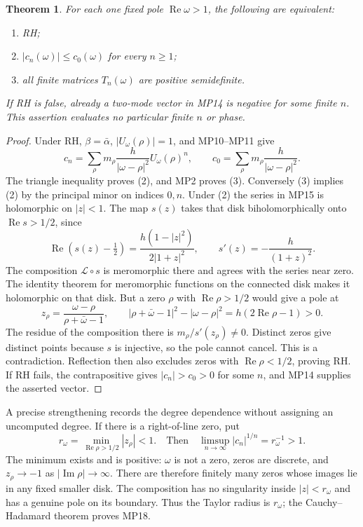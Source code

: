 \documentclass[11pt]{article}
\newtheorem{theorem}{Theorem}
\newcommand{\LL}{\mathscr L}
\newcommand{\Rea}{\operatorname{Re}}
\newcommand{\Ima}{\operatorname{Im}}
\begin{document}
\begin{theorem}
For each one fixed pole $\Rea\omega>1$, the following are equivalent:
\begin{enumerate}
\item RH;
\item $|c_n(\omega)|\leq c_0(\omega)$ for every $n\geq1$;
\item all finite matrices $T_n(\omega)$ are positive semidefinite.
\end{enumerate}
If RH is false, already a two-mode vector in MP14 is negative for some
finite $n$. This assertion evaluates no particular finite $n$ or phase.
\end{theorem}
\begin{proof}
Under RH, $\beta=\bar\alpha$, $|U_\omega(\rho)|=1$, and
MP10--MP11 give
\[
 c_n=\sum_\rho m_\rho\frac h{|\omega-\rho|^2}
                                      U_\omega(\rho)^n,
 \qquad c_0=\sum_\rho m_\rho\frac h{|\omega-\rho|^2}.
\]
The triangle inequality proves (2), and MP2 proves (3).
Conversely (3) implies (2) by the principal minor on indices $0,n$.
Under (2) the series in MP15 is holomorphic on $|z|<1$.
The map $s(z)$ takes that disk biholomorphically onto $\Rea s>1/2$,
since
\begin{equation}
 \Rea(s(z)-\tfrac12)=\frac{h(1-|z|^2)}{2|1+z|^2},\qquad
 s'(z)=-\frac h{(1+z)^2}.\tag{MP16}
\end{equation}
The composition $\LL\circ s$ is meromorphic there and agrees with the
series near zero. The identity theorem for meromorphic functions on the
connected disk makes it holomorphic on that disk. But a zero $\rho$ with
$\Rea\rho>1/2$ would give a pole at
\begin{equation}
 z_\rho=\frac{\omega-\rho}{\rho+\bar\omega-1},\qquad
 |\rho+\bar\omega-1|^2-|\omega-\rho|^2
                       =h(2\Rea\rho-1)>0.\tag{MP17}
\end{equation}
The residue of the composition there is
$m_\rho/s'(z_\rho)\ne0$. Distinct zeros give distinct points because
$s$ is injective, so the pole cannot cancel. This is a contradiction.
Reflection then also excludes zeros with $\Rea\rho<1/2$, proving RH.
If RH fails, the contrapositive gives $|c_n|>c_0>0$ for some $n$,
and MP14 supplies the asserted vector.
\end{proof}

A precise strengthening records the degree dependence without assigning
an uncomputed degree. If there is a right-of-line zero, put
\begin{equation}
 r_\omega=\min_{\Rea\rho>1/2}|z_\rho|<1.
 \quad\text{Then}\quad
 \limsup_{n\longrightarrow\infty}|c_n|^{1/n}=r_\omega^{-1}>1.
 \tag{MP18}
\end{equation}
The minimum exists and is positive: $\omega$ is not a zero, zeros are
discrete, and $z_\rho\to-1$ as $|\Ima\rho|\to\infty$. There are
therefore finitely many zeros whose images lie in any fixed smaller disk.
The composition has no singularity inside $|z|<r_\omega$ and has a
genuine pole on its boundary. Thus the Taylor radius is $r_\omega$;
the Cauchy--Hadamard theorem proves MP18.
\end{document}

